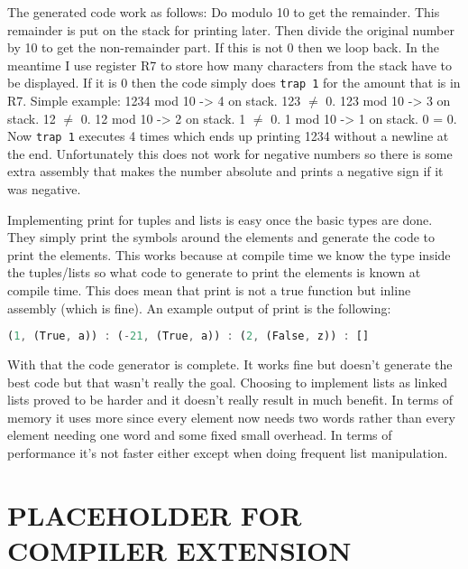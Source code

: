 \documentclass{article}
\begin{document}
The generated code work as follows: Do modulo 10 to get the remainder. This remainder is put on the stack for printing later. Then divide the original number by 10 to get the non-remainder part. If this is not 0 then we loop back. In the meantime I use register R7 to store how many characters from the stack have to be displayed. If it is 0 then the code simply does \texttt{trap 1} for the amount that is in R7. Simple example: 1234 mod 10 -\textgreater{ }4 on stack. 123 $\neq$ 0. 123 mod 10 -\textgreater{ }3 on stack. 12 $\neq$ 0. 12 mod 10 -\textgreater{ }2 on stack. 1 $\neq$ 0. 1 mod 10 -\textgreater{ }1 on stack. 0 = 0. Now \texttt{trap 1} executes 4 times which ends up printing 1234 without a newline at the end. Unfortunately this does not work for negative numbers so there is some extra assembly that makes the number absolute and prints a negative sign if it was negative.

Implementing print for tuples and lists is easy once the basic types are done. They simply print the symbols around the elements and generate the code to print the elements. This works because at compile time we know the type inside the tuples/lists so what code to generate to print the elements is known at compile time. This does mean that print is not a true function but inline assembly (which is fine). An example output of print is the following:
\begin{lstlisting}[language=Rust, style=boxed]
(1, (True, a)) : (-21, (True, a)) : (2, (False, z)) : []
\end{lstlisting}

With that the code generator is complete. It works fine but doesn't generate the best code but that wasn't really the goal. Choosing to implement lists as linked lists proved to be harder and it doesn't really result in much benefit. In terms of memory it uses more since every element now needs two words rather than every element needing one word and some fixed small overhead. In terms of performance it's not faster either except when doing frequent list manipulation.

\section{PLACEHOLDER FOR COMPILER EXTENSION}

\clearpage
\appendix
\end{document}
